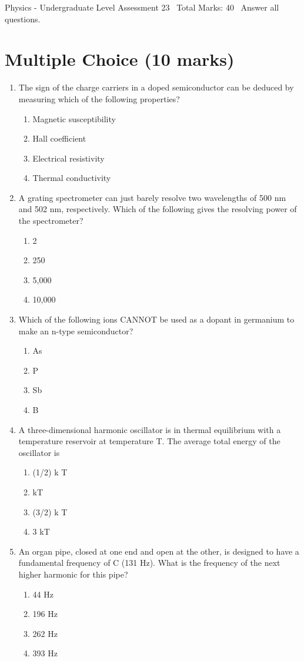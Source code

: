 \documentclass[12pt]{article}
\begin{document}
\begin{center}
Physics - Undergraduate Level Assessment 23 \
Total Marks: 40 \
Answer all questions.
\end{center}

\section*{Multiple Choice (10 marks)}
\begin{enumerate}[label=\arabic*.]
\item The sign of the charge carriers in a doped semiconductor can be deduced by measuring which of the following properties?
\begin{enumerate}[label=(\alph*)]
    \item Magnetic susceptibility
    \item Hall coefficient
    \item Electrical resistivity
    \item Thermal conductivity
\end{enumerate}
\item A grating spectrometer can just barely resolve two wavelengths of 500 nm and 502 nm, respectively. Which of the following gives the resolving power of the spectrometer?
\begin{enumerate}[label=(\alph*)]
    \item 2
    \item 250
    \item 5,000
    \item 10,000
\end{enumerate}
\item Which of the following ions CANNOT be used as a dopant in germanium to make an n-type semiconductor?
\begin{enumerate}[label=(\alph*)]
    \item As
    \item P
    \item Sb
    \item B
\end{enumerate}
\item A three-dimensional harmonic oscillator is in thermal equilibrium with a temperature reservoir at temperature T. The average total energy of the oscillator is
\begin{enumerate}[label=(\alph*)]
    \item (1/2) k T
    \item kT
    \item (3/2) k T
    \item 3 kT
\end{enumerate}
\item An organ pipe, closed at one end and open at the other, is designed to have a fundamental frequency of C (131 Hz). What is the frequency of the next higher harmonic for this pipe?
\begin{enumerate}[label=(\alph*)]
    \item 44 Hz
    \item 196 Hz
    \item 262 Hz
    \item 393 Hz
\end{enumerate}
\end{enumerate}
\end{document}
